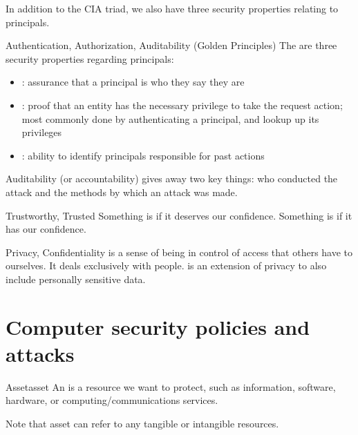 \documentclass[12pt]{report}
\begin{document}
In addition to the CIA triad, we also have three security properties relating to principals.
\begin{dfnbox}{Authentication, Authorization, Auditability (Golden Principles)}{}
    The  are three security properties regarding principals:

    \begin{itemize}[noitemsep]
        \item {}: assurance that a principal is who they say they are
        \item {}: proof that an entity has the necessary privilege to take the request action; most commonly done by authenticating a principal, and lookup up its privileges
        \item {}: ability to identify principals responsible for past actions
    \end{itemize}

\end{dfnbox}

Auditability (or accountability) gives away two key things: who conducted the attack and the methods by which an attack was made.

\begin{dfnbox}{Trustworthy, Trusted}{}
    Something is  if it deserves our confidence.     Something is  if it has our confidence.

\end{dfnbox}

\begin{dfnbox}{Privacy, Confidentiality}{}
     is a sense of being in control of access that others have to ourselves. It deals exclusively with people.  is an extension of privacy to also include personally sensitive data.
\end{dfnbox}

\section{Computer security policies and attacks}

\begin{dfnbox}{Asset}{asset}
    An  is a resource we want to protect, such as information, software, hardware, or computing/communications services.
\end{dfnbox}

Note that asset can refer to any tangible or intangible resources.
\end{document}
